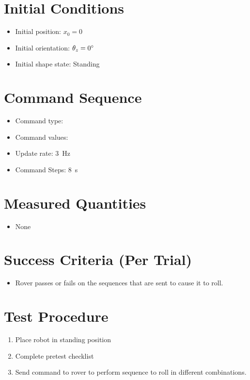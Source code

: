 \documentclass[11pt]{article}
\begin{document}
\section*{Initial Conditions}
\begin{itemize}[noitemsep]
    \item Initial position: $x_0 = 0$
    \item Initial orientation: $\theta_z = 0 {\degree}$
    \item Initial shape state: Standing
\end{itemize}

\section*{Command Sequence}
\begin{itemize}[noitemsep]
    \item Command type: \underline{\hspace{5 cm}}
    \item Command values: \underline{\hspace{5 cm}}
    \item Update rate: 3~Hz
    \item Command Steps: 8~s
\end{itemize}

\section*{Measured Quantities}
\begin{itemize}[noitemsep]
    \item None
\end{itemize}

\section*{Success Criteria (Per Trial)}
\begin{itemize}[noitemsep]
    \item Rover passes or fails on the sequences that are sent to cause it to roll.
\end{itemize}

\section*{Test Procedure}
\begin{enumerate}[noitemsep]
    \item Place robot in standing position
    \item Complete pretest checklist
    \item Send command to rover to perform sequence to roll in different combinations.

\end{enumerate}
\end{document}
